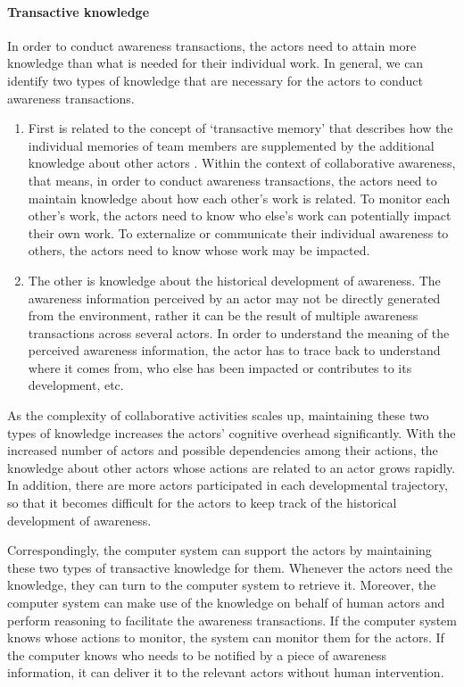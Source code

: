 \paragraph*{Transactive knowledge} %
\label{par:transactive_knowledge}
In order to conduct awareness transactions, the actors need to attain more knowledge than what is needed for their individual work. In general, we can identify two types of knowledge that are necessary for the actors to conduct awareness transactions.
\begin{enumerate}
   \item First is related to the concept of `transactive memory' that describes how the individual memories of team members are supplemented by the additional knowledge about other actors \cite{wegner1987transactive}. Within the context of collaborative awareness, that means, in order to conduct awareness transactions, the actors need to maintain knowledge about how each other's work is related. To monitor each other's work, the actors need to know who else's work can potentially impact their own work. To externalize or communicate their individual awareness to others, the actors need to know whose work may be impacted.  
   \item The other is knowledge about the historical development of awareness. The awareness information perceived by an actor may not be directly generated from the environment, rather it can be the result of multiple awareness transactions across several actors. In order to understand the meaning of the perceived awareness information, the actor has to trace back to understand where it comes from, who else has been impacted or contributes to its development, etc.
\end{enumerate}

As the complexity of collaborative activities scales up, maintaining these two types of knowledge increases the actors' cognitive overhead significantly. With the increased number of actors and possible dependencies among their actions, the knowledge about other actors whose actions are related to an actor grows rapidly. In addition, there are more actors participated in each developmental trajectory, so that it becomes difficult for the actors to keep track of the historical development of awareness.

Correspondingly, the computer system can support the actors by maintaining these two types of transactive knowledge for them. Whenever the actors need the knowledge, they can turn to the computer system to retrieve it. Moreover, the computer system can make use of the knowledge on behalf of human actors and perform reasoning to facilitate the awareness transactions. If the computer system knows whose actions to monitor, the system can monitor them for the actors. If the computer knows who needs to be notified by a piece of awareness information, it can deliver it to the relevant actors without human intervention.


